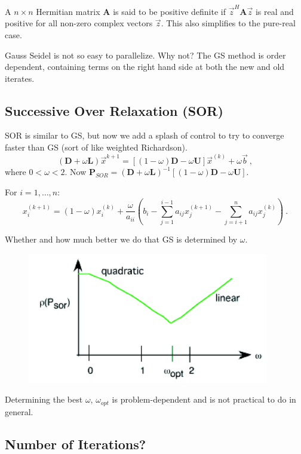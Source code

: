 \documentclass[12pt]{article}
\newcommand{\ve}[1]{\ensuremath{\mathbf{#1}}}
\begin{document}
A $n \times n$ Hermitian matrix $\ve{A}$ is said to be positive definite if $\vec{z}^H \ve{A} \vec{z}$ is real and positive for all non-zero complex vectors $\vec{z}$. This also simplifies to the pure-real case.

Gauss Seidel is not so easy to parallelize. Why not? The GS method is order dependent, containing terms on the right hand side at both the new and old iterates.


\subsection{Successive Over Relaxation (SOR)}

SOR is similar to GS, but now we add a splash of control to try to converge faster than GS (sort of like weighted Richardson). 
%
\[(\ve{D} + \omega \ve{L})\vec{x}^{k+1} = [(1-\omega)\ve{D} - \omega \ve{U}] \vec{x}^{(k)} + \omega\vec{b}\:, \]
%
where $0 < \omega < 2$. Now $\ve{P}_{SOR} = (\ve{D} + \omega\ve{L})^{-1} [(1-\omega)\ve{D} - \omega \ve{U}]$. 

For $i = 1, \dots, n$:
\[ x^{(k+1)}_i = (1-\omega)x_i^{(k)} + \frac{\omega}{a_{ii}}(b_i - \sum_{j=1}^{i-1} a_{ij} x_j^{(k+1)} - \sum_{j=i+1}^{n} a_{ij} x_j^{(k)}) \:.\]

Whether and how much better we do that GS is determined by $\omega$.
%
\begin{figure}[h!]
\begin{center}
\includegraphics[height=2.25in]{SOR-omega}
\end{center}
\end{figure}
%
Determining the best $\omega$, $\omega_{opt}$ is problem-dependent and is not practical to do in general.

\subsection{Number of Iterations?}
\end{document}
